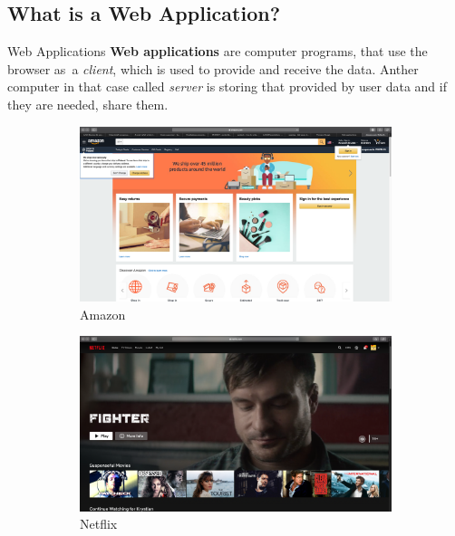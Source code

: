 \documentclass{beamer}
\begin{document}
	\subsection{What is a Web Application?}
	\begin{frame}{Web Applications}
		\textbf{Web applications} are computer programs, that use the browser as~a \textit{client}, which is used to provide and receive the data. Anther computer in that case called \textit{server} is storing that provided by user data and if they are needed, share them. \\
	
		\begin{figure}[h!]
  			\centering
  			\begin{subfigure}[b]{0.3\linewidth}
    			\includegraphics[width=\linewidth]{pictures/amazon}
    			\caption{Amazon}
  			\end{subfigure}
  			\begin{subfigure}[b]{0.3\linewidth}
    			\includegraphics[width=\linewidth]{pictures/netflix}
    			\caption{Netflix}
  			\end{subfigure}
  		 	\begin{subfigure}[b]{0.3\linewidth}

\end{subfigure}
\end{figure}
\end{frame}
\end{document}
